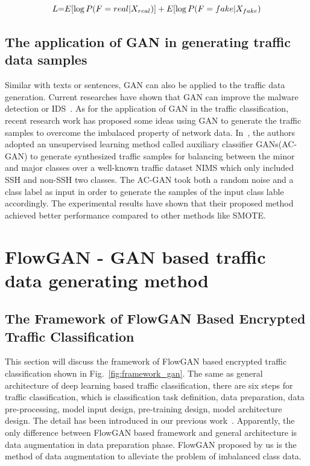 \documentclass[letterpaper,12pt]{article}
\begin{document}
\begin{equation}
L{\rm{ = }}E[\log P(F = real|{X_{real}})] + E[\log P(F = fake|{X_{fake}})
\label{equ:fake}
\end{equation}




\subsection{The application of GAN in generating traffic data samples}
Similar with texts or sentences, GAN can also be applied to the traffic data generation. Current researches have shown that GAN can improve the malware detection or IDS~\cite{Hu2017GAN}. As for the application of GAN in the traffic classification, recent research work has proposed some ideas using GAN to generate the traffic samples to overcome the imbalaced property of network data. In~\cite{Vu-GAN}, the authors adopted an unsupervised learning method called auxiliary classifier GANs(AC-GAN) to generate synthesized traffic samples for balancing between the minor and major classes over a well-known traffic dataset NIMS which only included SSH and non-SSH two classes. The AC-GAN took both a random noise and a class label as input in order to generate the samples of the input class lable accordingly. The experimental results have shown that their proposed method achieved better performance compared to other methods like SMOTE. 


\section{FlowGAN - GAN based traffic data generating method}\label{sec:flowgan}

\subsection{The Framework of FlowGAN Based Encrypted Traffic Classification}
This section will discuss the framework of FlowGAN based encrypted traffic classification shown in Fig.~\ref{fig:framework_gan}. The same as general architecture of deep learning based traffic classification, there are six steps for traffic classification, which is  classification task definition, data preparation, data pre-processing, model input design, pre-training design, model architecture design. The detail has been introduced in our previous work~\cite{TC-DL-Survey}. Apparently, the only difference between FlowGAN based framework and general architecture is data augmentation in data preparation phase. FlowGAN proposed by us is the method of data augmentation to alleviate the problem of imbalanced class data.
\end{document}
